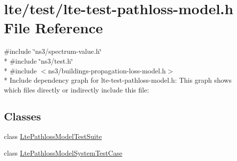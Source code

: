 \hypertarget{lte-test-pathloss-model_8h}{}\section{lte/test/lte-\/test-\/pathloss-\/model.h File Reference}
\label{lte-test-pathloss-model_8h}
{\ttfamily \#include \char`\"{}ns3/spectrum-\/value.\+h\char`\"{}}\\*
{\ttfamily \#include \char`\"{}ns3/test.\+h\char`\"{}}\\*
{\ttfamily \#include $<$ns3/buildings-\/propagation-\/loss-\/model.\+h$>$}\\*
Include dependency graph for lte-\/test-\/pathloss-\/model.h\+:
This graph shows which files directly or indirectly include this file\+:
\subsection*{Classes}
\begin{DoxyCompactItemize}
\item 
class \hyperlink{classLtePathlossModelTestSuite}{Lte\+Pathloss\+Model\+Test\+Suite}
\item 
class \hyperlink{classLtePathlossModelSystemTestCase}{Lte\+Pathloss\+Model\+System\+Test\+Case}
\end{DoxyCompactItemize}
